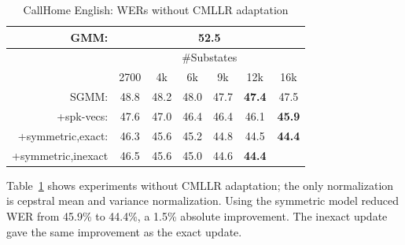 \documentclass{article}
\begin{document}
\begin{table}[h]
 \renewcommand\arraycolsep{-0.1in}
  \begin{tabular}{|rcccccc|}           \hline 
  GMM:            &  \multicolumn{6}{c|}{    52.5                          }   \\ \hline  %
                  &   \multicolumn{6}{c|}{ \#Substates    }                \\
                  &  2700  &  4k    &  6k  & 9k   &  12k   &  16k    \\  \hline
  SGMM:             & 48.8   & 48.2 & 48.0  & 47.7  &{\bf 47.4}   &  47.5  \\
  +spk-vecs:        & 47.6   & 47.0  & 46.4  & 46.4  & 46.1  &{\bf  45.9} \\
  +symmetric,exact: & 46.3    & 45.6 &  45.2  & 44.8  & 44.5 &{\bf 44.4}  \\ 
+symmetric,inexact & 46.5    & 45.6  &  45.0  & 44.6  & {\bf 44.4}&           \\ \hline
  \end{tabular}
   \caption{CallHome English: WERs without CMLLR adaptation }
 \label{tab:callhome:nocmllr}
\end{table}


Table~\ref{tab:callhome:nocmllr} shows experiments without CMLLR adaptation; the only
normalization is cepstral mean and variance normalization.  Using the symmetric
model reduced WER from 45.9\% to 44.4\%, a 1.5\% absolute improvement.   The inexact
update gave the same improvement as the exact update.
\end{document}
